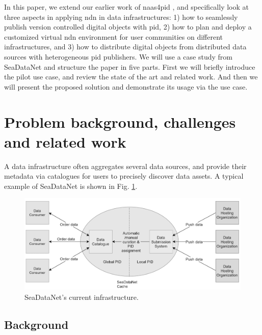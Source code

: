 \documentclass[conference]{IEEEtran}
\begin{document}
In this paper, we extend our earlier work of \gls{naas4pid} \cite{koulouzis2018information}, and specifically look at three aspects in applying \gls{ndn} in data infrastructures: 1) how to seamlessly publish version controlled digital objects with \gls{pid}, 2) how to plan and deploy a customized virtual \gls{ndn} environment for user communities on different infrastructures, and 3) how to distribute digital objects from distributed data sources with heterogeneous \gls{pid} publishers. We will use a case study from SeaDataNet and structure the paper in five parts. First we will briefly introduce the pilot use case, and review the state of the art and related work. And then we will present the proposed solution and demonstrate its usage via the use case.




\section{Problem background, challenges and related work}
\label{problem-background}
A data infrastructure often aggregates several data sources, and provide their metadata via catalogues for users to precisely discover data assets. A typical example of SeaDataNet is shown in Fig. \ref{fig:sdc_cur}. 
\begin{figure}[H]
\centering
\includegraphics[width=\columnwidth]{images/SDC_current.png}
\caption{SeaDataNet's current infrastructure.}
\label{fig:sdc_cur}
\end{figure}
\subsection{Background}
\end{document}
